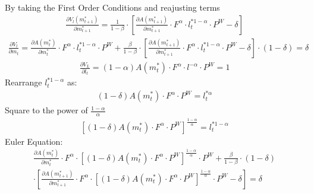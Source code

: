 \documentclass[12pt]{article}
\begin{document}
\normalsize
By taking the First Order Conditions and reajusting terms
\begin{equation}
\begin{aligned}
\frac{\partial V_l(m^\ast_{t+1})}{\partial m^\ast_{t+1}}=\frac{1}{1-\beta}\cdot \left[\frac{\partial A(m^\ast_{t+1})}{\partial m^\ast_{t+1}}\cdot F^\alpha \cdot l^{\ast 1-\alpha}_t \cdot P^W-\delta\right]
\end{aligned}
\end{equation}
\[
\]
\begin{equation}
\begin{aligned}
\frac{\partial V_l}{\partial m_t}=\frac{\partial A(m^\ast_t)}{\partial m^\ast_t} \cdot F^\alpha \cdot l^{\ast 1-\alpha}_t \cdot P^W+\frac{\beta}{1-\beta}\cdot \left[\frac{\partial A(m^\ast_{t+1})}{\partial m^\ast_{t+1}}\cdot F^\alpha \cdot l^{\ast 1-\alpha}_t \cdot P^W-\delta\right]\cdot(1-\delta)=\delta\
\end{aligned}
\end{equation}
\[
\]
\begin{equation}
\begin{aligned}
\frac{\partial V_L}{\partial l_t}= (1-\alpha) A(m^\ast_t) \cdot F^\alpha \cdot l^{-\alpha} \cdot P^W =1
\end{aligned}
\end{equation}
\[
\]
\normalsize
Rearrange $l^{\ast 1-\alpha}_t$ as:
\begin{equation}
\begin{aligned}
(1-\delta)A(m^\ast_t)\cdot F^\alpha \cdot P^W=l^{\ast \alpha}_t
\end{aligned}
\end{equation}
\[
\]
\normalsize
Square to the power of $\frac{1-\alpha}{\alpha}$
\begin{equation}
\begin{aligned}
\left[(1-\delta)A(m^\ast_t)\cdot F^\alpha \cdot P^W\right]^\frac{1-\alpha}{\alpha}= l^{\ast 1-\alpha}_t 
\end{aligned}
\end{equation}
\[
\]
\normalsize
Euler Equation:
\begin{equation}
\begin{aligned}
\frac{\partial A(m^\ast_t)}{\partial m^\ast_t} \cdot F^\alpha \cdot \left[(1-\delta)A(m^\ast_t)\cdot F^\alpha \cdot P^W\right]^\frac{1-\alpha}{\alpha}\cdot P^W +\frac{\beta}{1-\beta}\cdot (1-\delta)\\\cdot\left[\frac{\partial A(m^\ast_{t+1})}{\partial m^\ast_{t+1}}\cdot F^\alpha\cdot \left[(1-\delta)A(m^\ast_t)\cdot F^\alpha\cdot P^W\right]^\frac{1-\alpha}{\alpha}\cdot P^W-\delta\right]=\delta
\end{aligned}
\end{equation}
\end{document}
